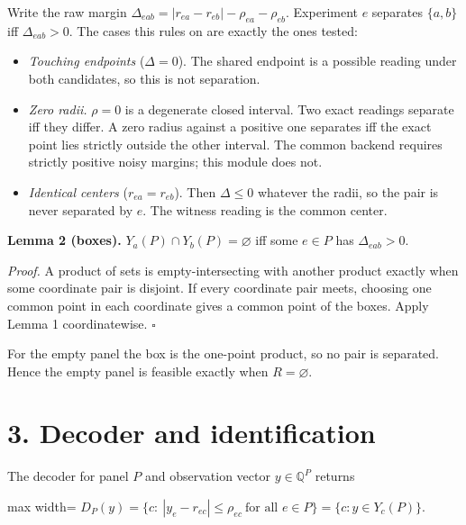 \documentclass[
  11pt,
  a4paper,
]{report}
\providecommand{\tightlist}{%
  \setlength{\itemsep}{0pt}\setlength{\parskip}{0pt}}
\begin{document}
Write the raw margin
\(\Delta_{eab}=|r_{ea}-r_{eb}|-\rho_{ea}-\rho_{eb}\). Experiment \(e\)
separates \(\{a,b\}\) iff \(\Delta_{eab}>0\). The cases this rules on
are exactly the ones tested:

\begin{itemize}
\tightlist
\item
  \emph{Touching endpoints} (\(\Delta=0\)). The shared endpoint is a
  possible reading under both candidates, so this is not separation.
\item
  \emph{Zero radii.} \(\rho=0\) is a degenerate closed interval. Two
  exact readings separate iff they differ. A zero radius against a
  positive one separates iff the exact point lies strictly outside the
  other interval. The common backend requires strictly positive noisy
  margins; this module does not.
\item
  \emph{Identical centers} (\(r_{ea}=r_{eb}\)). Then \(\Delta\le0\)
  whatever the radii, so the pair is never separated by \(e\). The
  witness reading is the common center.
\end{itemize}

\textbf{Lemma 2 (boxes).} \(Y_a(P)\cap Y_b(P)=\varnothing\) iff some
\(e\in P\) has \(\Delta_{eab}>0\).

\emph{Proof.} A product of sets is empty-intersecting with another
product exactly when some coordinate pair is disjoint. If every
coordinate pair meets, choosing one common point in each coordinate
gives a common point of the boxes. Apply Lemma 1 coordinatewise.
\(\square\)

For the empty panel the box is the one-point product, so no pair is
separated. Hence the empty panel is feasible exactly when
\(R=\varnothing\).

\hypertarget{decoder-and-identification}{%
\section{3. Decoder and
identification}\label{decoder-and-identification}}

The decoder for panel \(P\) and observation vector \(y\in\mathbb Q^P\)
returns

\begin{center}
\begin{adjustbox}{max width=\linewidth}
$\displaystyle
D_P(y)=\{c:\ |y_e-r_{ec}|\le\rho_{ec}\ \text{for all }e\in P\}=\{c: y\in Y_c(P)\}.
$
\end{adjustbox}
\end{center}
\end{document}
